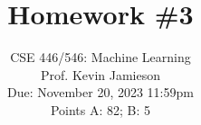 \documentclass{article}
\begin{document}
\setcounter{aprob}{0}
\title{Homework \#3}
\author{
    \normalsize{CSE 446/546: Machine Learning}\\
    \normalsize{Prof. Kevin Jamieson}\\
    \normalsize{Due: November 20, 2023 11:59pm}\\
    \normalsize{Points A: 82; B: 5}
}
\date{{}}
\maketitle

\end{document}
